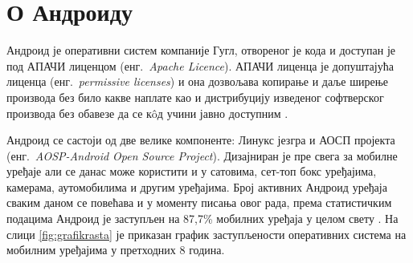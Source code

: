 \documentclass[12pt,oneside]{memoir}
\theoremstyle{remark}
\begin{document}






\chapter{О Андроиду}
\label{chp:android}
Андроид је оперативни систем компаније Гугл, отвореног је кода и доступан је под АПАЧИ лиценцом  (енг.~{\em Apache Licence}). АПАЧИ лиценца је допуштајућа лиценца (енг.~{\em permissive licenses}) и она дозвољава копирање и даље ширење производа без било какве наплате као и дистрибуцију изведеног софтверског производа без обавезе да се к\^{o}д учини јавно доступним \cite{apache,aospapache}.

Андроид се састоји од две велике компоненте: Линукс језгра и АОСП пројекта (енг.~{\em AOSP-Android Open Source Project}). Дизајниран је пре свега за мобилне уређаје али се данас може користити и у сатовима, сет-топ бокс уређајима, камерама, аутомобилима и другим уређајима. Број активних Андроид уређаја сваким даном се повећава и у моменту писања овог рада, према статистичким подацима Андроид је заступљен на 87,7\% мобилних уређаја у целом свету \cite{marketshare}. На слици \ref{fig:grafikrasta} је приказан график заступљености оперативних система на мобилним уређајима у претходних 8 година.
\end{document}
